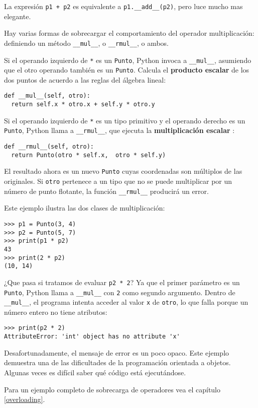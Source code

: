 La expresión \texttt{p1 + p2} es equivalente a \texttt{p1.\_\_add\_\_(p2)},
pero luce mucho mas elegante.

Hay varias formas de sobrecargar el comportamiento del operador multiplicación:
definiendo un método \texttt{\_\_mul\_\_}, o \texttt{\_\_rmul\_\_},
o ambos.

Si el operando izquierdo de \texttt{{*}} es un \texttt{Punto}, Python
invoca a \texttt{\_\_mul\_\_}, asumiendo que el otro operando también
es un \texttt{Punto}. Calcula el \textbf{producto escalar} de los
dos puntos de acuerdo a las reglas del álgebra lineal:
\begin{verbatim}
def __mul__(self, otro):
  return self.x * otro.x + self.y * otro.y
\end{verbatim}

Si el operando izquierdo de \texttt{{*}} es un tipo primitivo y el
operando derecho es un \texttt{Punto}, Python llama a \texttt{\_\_rmul\_\_},
que ejecuta la \textbf{multiplicación escalar }:
\begin{verbatim}
def __rmul__(self, otro):
  return Punto(otro * self.x,  otro * self.y)
\end{verbatim}

El resultado ahora es un nuevo \texttt{Punto} cuyas coordenadas son
múltiplos de las originales. Si \texttt{otro} pertenece a un tipo
que no se puede multiplicar por un número de punto flotante, la función
\texttt{\_\_rmul\_\_} producirá un error.

Este ejemplo ilustra las dos clases de multiplicación:
\begin{verbatim}
>>> p1 = Punto(3, 4)
>>> p2 = Punto(5, 7)
>>> print(p1 * p2)
43
>>> print(2 * p2)
(10, 14)
\end{verbatim}
 ¿Que pasa si tratamos de evaluar \texttt{p2 {*} 2}? Ya que el primer
parámetro es un \texttt{Punto}, Python llama a \texttt{\_\_mul\_\_}
con \texttt{2} como segundo argumento. Dentro de \texttt{\_\_mul\_\_},
el programa intenta acceder al valor \texttt{x} de \texttt{otro},
lo que falla porque un número entero no tiene atributos:

\begin{verbatim}
>>> print(p2 * 2)
AttributeError: 'int' object has no attribute 'x'
\end{verbatim}
 Desafortunadamente, el mensaje de error es un poco opaco. Este ejemplo
demuestra una de las dificultades de la programación orientada a objetos.
Algunas veces es difícil saber qué código está ejecutándose.

Para un ejemplo completo de sobrecarga de operadores vea el capítulo
\ref{overloading}.

